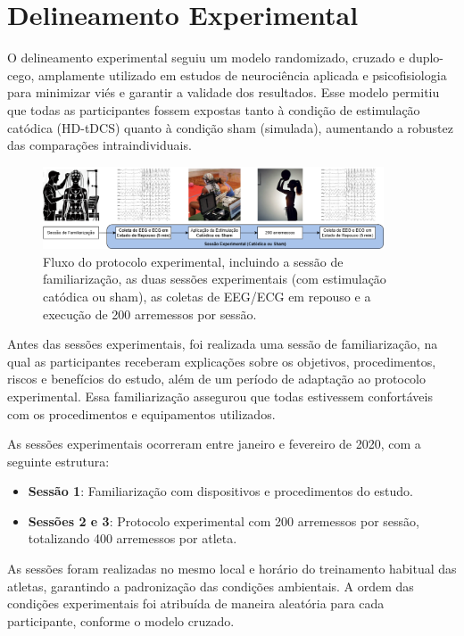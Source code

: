 \section{Delineamento Experimental}

O delineamento experimental seguiu um modelo randomizado, cruzado e duplo-cego, amplamente utilizado em estudos de neurociência aplicada e psicofisiologia para minimizar viés e garantir a validade dos resultados. Esse modelo permitiu que todas as participantes fossem expostas tanto à condição de estimulação catódica (HD-tDCS) quanto à condição sham (simulada), aumentando a robustez das comparações intraindividuais.

\begin{figure}[htb]
    \centering
    \includegraphics[width=0.9\textwidth]{figs/0_intro_e_desenho_experimental/desenho_experimental_drawio.png}
    \caption{Fluxo do protocolo experimental, incluindo a sessão de familiarização, as duas sessões experimentais (com estimulação catódica ou sham), as coletas de EEG/ECG em repouso e a execução de 200 arremessos por sessão.}
    \label{fig:desenho_experimental}
\end{figure}

Antes das sessões experimentais, foi realizada uma sessão de familiarização, na qual as participantes receberam explicações sobre os objetivos, procedimentos, riscos e benefícios do estudo, além de um período de adaptação ao protocolo experimental. Essa familiarização assegurou que todas estivessem confortáveis com os procedimentos e equipamentos utilizados.

As sessões experimentais ocorreram entre janeiro e fevereiro de 2020, com a seguinte estrutura:
\begin{itemize}
    \item \textbf{Sessão 1}: Familiarização com dispositivos e procedimentos do estudo.
    \item \textbf{Sessões 2 e 3}: Protocolo experimental com 200 arremessos por sessão, totalizando 400 arremessos por atleta.
\end{itemize}

As sessões foram realizadas no mesmo local e horário do treinamento habitual das atletas, garantindo a padronização das condições ambientais. A ordem das condições experimentais foi atribuída de maneira aleatória para cada participante, conforme o modelo cruzado.


